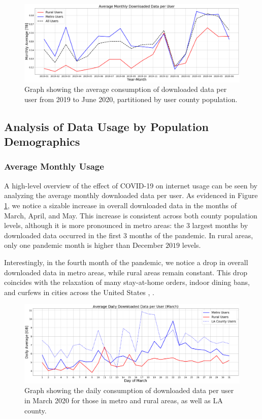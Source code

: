 \begin{figure}
\centering
\includegraphics[width=1.0\linewidth]{figs/monthly_downloaded_data.png}
\caption{Graph showing the average consumption of downloaded data per user from 2019 to June 2020, partitioned by user county population.}
\label{fig:downloadmetro_rural}
\end{figure}

\subsection{Analysis of Data Usage by Population Demographics}

\subsubsection{Average Monthly Usage}
A high-level overview of the effect of COVID-19 on internet usage can be seen by analyzing the average monthly downloaded data per user. As evidenced in Figure \ref{fig:downloadmetro_rural}, we notice a sizable increase in overall downloaded data in the months of March, April, and May. This increase is consistent across both county population levels, although it is more pronounced in metro areas: the 3 largest months by downloaded data occurred in the first 3 months of the pandemic. In rural areas, only one pandemic month is higher than December $2019$ levels.

Interestingly, in the fourth month of the pandemic, we notice a drop in overall downloaded data in metro areas, while rural areas remain constant. This drop coincides with the relaxation of many stay-at-home orders, indoor dining bans, and curfews in cities across the United States \cite{money2020la}, \cite{gov2020nyc}. 

\begin{figure}
\centering
\includegraphics[width=1.0\linewidth]{figs/daily_downloaded_data.png}
\caption{Graph showing the daily consumption of downloaded data per user in March 2020 for those in metro and rural areas, as well as LA county.}
\label{fig:dailymetro_rural}
\end{figure}

